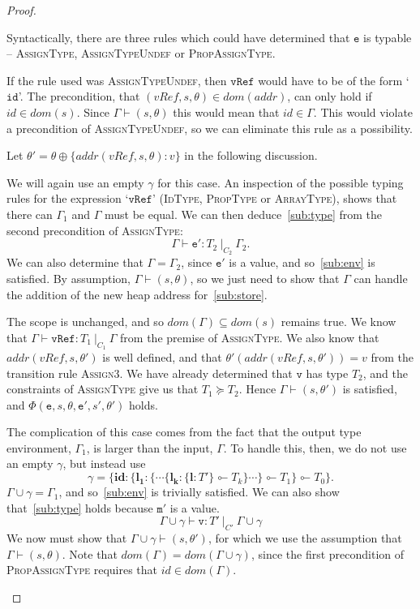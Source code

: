 \documentclass[12pt,a4paper,twoside,openright]{report}
\theoremstyle{definition}
\theoremstyle{dotless}
\newcommand*{\orig}{\ensuremath{\!\multimapinv\!}}
\begin{document}
\begin{proof}
\begin{case}[Assign]
	Syntactically, there are three rules which could have determined that
	$\mathtt{e}$ is typable -- \textsc{AssignType}, \textsc{AssignTypeUndef} or
	\textsc{PropAssignType}. 

	If the rule used was \textsc{AssignTypeUndef}, then $\mathtt{vRef}$ would
	have to be of the form `$\mathtt{id}$'. The precondition, that $(vRef,s,
	\theta)\in dom(addr)$, can only hold if $id\in dom(s)$. Since
	$\Gamma\vdash(s,\theta)$ this would mean that $id\in\Gamma$. This would
	violate a precondition of \textsc{AssignTypeUndef}, so we can eliminate
	this rule as a possibility.

	Let $\theta'=\theta\oplus\{addr(vRef,s,\theta):v\}$ in the following discussion.

	\begin{subcase}[AssignType]
	  We will again use an empty $\gamma$ for this case.
	  An inspection of the possible typing rules for the expression `$\mathtt{vRef}$'
	  (\textsc{IdType, PropType} or \textsc{ArrayType}), shows that there can
	  $\Gamma_1$ and $\Gamma$ must be equal.
	  We can then deduce~\eqref{sub:type} from the second precondition of \textsc{AssignType}:
	  $$\Gamma\vdash\mathtt{e'}:T_2\ |_{C_2}\ \Gamma_2.$$ 
	  We can also determine that $\Gamma=\Gamma_2$, since $\mathtt{e'}$ is a value, and
	  so~\eqref{sub:env} is satisfied. By assumption, $\Gamma\vdash(s,\theta)$, so
	  we just need to show that
	  $\Gamma$ can handle the addition of the new heap address for~\eqref{sub:store}.

 	  The scope is unchanged, and so $dom(\Gamma)\subseteq dom(s)$ remains true.
	  We know that $\Gamma\vdash\mathtt{vRef}:T_1\ |_{C_1}\ \Gamma$ from the premise of 
	  \textsc{AssignType}. We also know that $addr(vRef, s, \theta')$ is 
	  well defined, and that $\theta'(addr(vRef, s, \theta')) = v$ 
	  from the transition rule \textsc{Assign3}. We have already determined
	  that $\mathtt{v}$ has type $T_2$, and the constraints of \textsc{AssignType}
	  give us that $T_1\succeq T_2$. Hence $\Gamma\vdash(s,\theta')$ is satisfied,
	  and $\Phi(\mathtt{e},s,\theta,\mathtt{e'},s',\theta')$ holds.
  	\end{subcase}

	\begin{subcase}[PropAssignType]
	  The complication of this case comes from
	  the fact that the output type environment, $\Gamma_1$, is larger than the input, $\Gamma$.
	  To handle this, then, we do not use an empty $\gamma$, but instead use
	  $$\gamma=\{\textbf{id}: \{ \mathbf{l_1}: \{\cdots \{\mathbf{l_k}:\{\mathbf{l}: T'\}\orig T_k \} \cdots\} \orig T_1\}\orig T_0\}.$$
	  $\Gamma\!\cup\!\gamma=\Gamma_1$, and so~\eqref{sub:env} is trivially
	  satisfied. We can also show that~\eqref{sub:type} holds because $\mathtt{m'}$ is a value.
	  $$\Gamma\!\cup\!\gamma\vdash\mathtt{v}:T'\ |_{C'}\ \Gamma\!\cup\!\gamma$$
	  We now must show that $\Gamma\!\cup\!\gamma\vdash(s,
	  \theta')$, for which we use the assumption that
	  $\Gamma\vdash(s,\theta)$. Note that
	  $dom(\Gamma)=dom(\Gamma\cup\gamma)$, since the first precondition
	  of \textsc{PropAssignType} requires that $id\in dom(\Gamma)$.


\end{subcase}
\end{case}
\end{proof}
\end{document}
